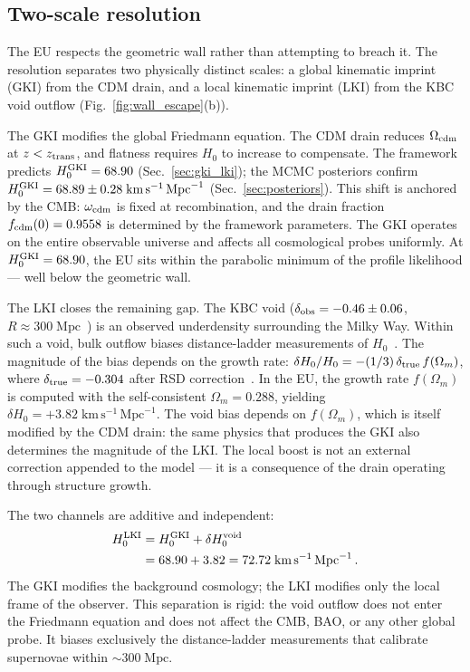 \documentclass[a4paper,fleqn]{cas-dc}
\newcommand{\ztrans}{z_{\rm trans}}
\begin{document}
\subsection{Two-scale resolution}
\label{sec:two_scale}

The EU respects the geometric wall rather than
attempting to breach it. The resolution separates
two physically distinct scales: a global kinematic
imprint (GKI) from the CDM drain, and a local
kinematic imprint (LKI) from the KBC void outflow
(Fig.~\ref{fig:wall_escape}(b)).

The GKI modifies the global Friedmann equation.
The CDM drain reduces $\Omega_{\rm cdm}$ at
$z < \ztrans$, and flatness requires $H_0$ to
increase to compensate. The framework predicts
$H_0^{\rm GKI} = 68.90$ (Sec.~\ref{sec:gki_lki});
the MCMC posteriors confirm
$H_0^{\rm GKI} = 68.89 \pm 0.28\;\text{km}\,\text{s}^{-1}\,\text{Mpc}^{-1}$
(Sec.~\ref{sec:posteriors}).
This shift is anchored by the CMB:
$\omega_{\rm cdm}$ is fixed at recombination, and the
drain fraction $f_{\rm cdm}(0) = 0.9558$ is determined
by the framework parameters. The GKI operates on the
entire observable universe and affects all cosmological
probes uniformly. At $H_0^{\rm GKI} = 68.90$, the
EU sits within the parabolic minimum of the profile
likelihood --- well below the geometric wall.

The LKI closes the remaining gap. The KBC void
($\delta_{\rm obs} = -0.46 \pm 0.06$, $R \approx
300\;\text{Mpc}$~\cite{keenan2013}) is an observed
underdensity surrounding the Milky Way. Within such a
void, bulk outflow biases distance-ladder measurements of
$H_0$~\cite{wu_huterer2017}. The magnitude of the bias
depends on the growth rate: $\delta H_0 / H_0 =
-(1/3)\,\delta_{\rm true}\,f(\Omega_m)$, where
$\delta_{\rm true} = -0.304$ after RSD
correction~\cite{haslbauer2020}. In the EU, the
growth rate $f(\Omega_m)$ is computed with the
self-consistent $\Omega_m = 0.288$, yielding
$\delta H_0 = +3.82\;\text{km}\,\text{s}^{-1}\,\text{Mpc}^{-1}$.
The void bias depends on $f(\Omega_m)$, which is
itself modified by the CDM drain: the same physics
that produces the GKI also determines the magnitude
of the LKI. The local boost is not an external
correction appended to the model --- it is a
consequence of the drain operating through structure
growth.

The two channels are additive and independent:
\begin{equation}
\begin{split}
H_0^{\rm LKI} &= H_0^{\rm GKI} + \delta H_0^{\rm void} \\
&= 68.90 + 3.82
= 72.72\;\text{km}\,\text{s}^{-1}\,\text{Mpc}^{-1}\,.
\end{split}
\label{eq:h0_lki}
\end{equation}
The GKI modifies the background cosmology; the LKI
modifies only the local frame of the observer. This
separation is rigid: the void outflow does not enter
the Friedmann equation and does not affect the CMB,
BAO, or any other global probe. It biases exclusively
the distance-ladder measurements that calibrate
supernovae within $\sim\!300\;\text{Mpc}$.
\end{document}
